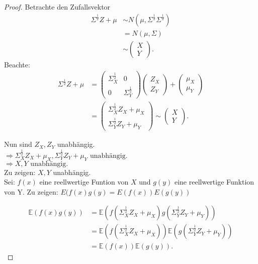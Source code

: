 \documentclass{tstextbook}
\begin{document}
\begin{proof}
Betrachte den Zufallsvektor 
	\begin{align*}
	 \Sigma^{\frac{1}{2}} Z + \mu & \sim N\left(\mu , \Sigma^{\frac{1}{2}} \Sigma^{\frac{1}{2}} \right) \\ 
	& = 
	N\left(\mu , \Sigma \right) \\
	& \sim 
	\begin{pmatrix}
		X \\ Y
	\end{pmatrix}. 
\end{align*}
	Beachte:
	\begin{align*}
		\Sigma^{\frac{1}{2}} Z + \mu & = \begin{pmatrix}
			\Sigma_X^{\frac{1}{2}} & 0 \\
			0 & \Sigma_Y^{\frac{1}{2}}
		\end{pmatrix} \begin{pmatrix} Z_X \\ Z_Y \end{pmatrix} + \begin{pmatrix} \mu_X \\ \mu_Y \end{pmatrix}\\
	& = \begin{pmatrix}
		\Sigma_X^{\frac{1}{2}} Z_X + \mu_X \\
		\Sigma_Y^{\frac{1}{2}} Z_Y + \mu_Y
	\end{pmatrix} \sim \begin{pmatrix}
	X \\ Y \end{pmatrix}.
	\end{align*}

Nun sind $ Z_X, Z_Y $ unabhängig. \\
$ \Rightarrow \Sigma_X^{\frac{1}{2}} Z_X + \mu_X, \Sigma_Y^{\frac{1}{2}} Z_Y + \mu_Y \text{ unabhängig}. $ \\
$ \Rightarrow X,Y \text{ unabhängig}. $ \\
Zu zeigen: $ X, Y $ unabhängig. \\
Sei: $ f(x) $ eine reellwertige Funtion von $ X $ und $ g(y) $ eine reellwertige Funktion von Y.
Zu zeigen: $ E(f(x)g(y) = E(f(x))E(g(y)) $

\begin{align*} \mathbb{E}(f(x)g(y)) & = \mathbb{E}\left( f\left( \Sigma_X^{\frac{1}{2}} Z_X + \mu_X \right)g\left( \Sigma_Y^{\frac{1}{2}} Z_Y + \mu_Y \right) \right) \\
	& = \mathbb{E}\left( f\left( \Sigma_X^{\frac{1}{2}} Z_X + \mu_X \right)\right) \mathbb{E}\left( g\left( \Sigma_Y^{\frac{1}{2}} Z_Y + \mu_Y \right)\right) \\
	& = \mathbb{E}(f(x)) \mathbb{E}(g(y)).
\end{align*}
\end{proof}
\end{document}
